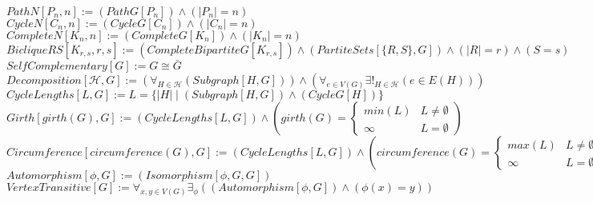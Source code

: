 \documentclass{book}
\newcommand{\abr}{:=}
\newcommand{\pr}[1]{\left(#1\right)}
\newcommand{\st}{\mathbin{|}}
\begin{document}
$PathN[P_n, n] \abr (PathG[P_n]) \land (|P_n| = n)$ \\
$CycleN[C_n, n] \abr (CycleG[C_n]) \land (|C_n| = n)$ \\
$CompleteN[K_n, n] \abr (CompleteG[K_n]) \land (|K_n| = n)$ \\
$BicliqueRS[K_{r, s}, r, s] \abr (CompleteBipartiteG[K_{r, s}]) \land (PartiteSets[\{R, S\}, G]) \land (|R| = r) \land (S = s)$ \\

$SelfComplementary[G] \abr G \cong \bar{G}$ \\
$Decomposition[\mathcal{H}, G] \abr \pr{\forall_{H \in \mathcal{H}}(Subgraph[H, G])} \land \pr{\forall_{e \in V(G)} \exists!_{H \in \mathcal{H}}\pr{e \in E(H)}}$ \\


$CycleLengths[L, G] \abr L = \{|H| \st (Subgraph[H, G]) \land (CycleG[H])\}$ \\
$Girth[girth(G), G] \abr (CycleLengths[L, G]) \land \left(girth(G) = 
\begin{cases} 
  min(L) & L \neq \emptyset \\
  \infty & L = \emptyset
\end{cases}\right)$ \\
$Circumference[circumference(G), G] \abr (CycleLengths[L, G]) \land \left(circumference(G) = 
\begin{cases} 
  max(L) & L \neq \emptyset \\
  \infty & L = \emptyset
\end{cases}\right)$ \\

$Automorphism[\phi, G] \abr (Isomorphism[\phi, G, G])$ \\ %
$VertexTransitive[G] \abr \forall_{x, y \in V(G)} \exists_{\phi}\pr{(Automorphism[\phi, G]) \land \pr{\phi(x) = y}}$ \\
\end{document}
